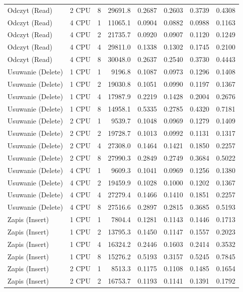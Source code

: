 \begin{table}[ht]
{\begin{tabular}{llcrrrrr}
Odczyt (Read) & 2 CPU & 8 & 29691.8 & 0.2687 & 0.2603 & 0.3739 & 0.4308 \\
Odczyt (Read) & 4 CPU & 1 & 11065.1 & 0.0904 & 0.0882 & 0.0988 & 0.1163 \\
Odczyt (Read) & 4 CPU & 2 & 21735.7 & 0.0920 & 0.0907 & 0.1120 & 0.1249 \\
Odczyt (Read) & 4 CPU & 4 & 29811.0 & 0.1338 & 0.1302 & 0.1745 & 0.2100 \\
Odczyt (Read) & 4 CPU & 8 & 30048.0 & 0.2637 & 0.2540 & 0.3730 & 0.4443 \\
Usuwanie (Delete) & 1 CPU & 1 & 9196.8 & 0.1087 & 0.0973 & 0.1296 & 0.1408 \\
Usuwanie (Delete) & 1 CPU & 2 & 19030.8 & 0.1051 & 0.0990 & 0.1197 & 0.1367 \\
Usuwanie (Delete) & 1 CPU & 4 & 17987.9 & 0.2219 & 0.1428 & 0.2004 & 0.2676 \\
Usuwanie (Delete) & 1 CPU & 8 & 14958.1 & 0.5335 & 0.2785 & 0.4320 & 0.7181 \\
Usuwanie (Delete) & 2 CPU & 1 & 9539.7 & 0.1048 & 0.0969 & 0.1279 & 0.1409 \\
Usuwanie (Delete) & 2 CPU & 2 & 19728.7 & 0.1013 & 0.0992 & 0.1131 & 0.1317 \\
Usuwanie (Delete) & 2 CPU & 4 & 27308.0 & 0.1464 & 0.1421 & 0.1850 & 0.2257 \\
Usuwanie (Delete) & 2 CPU & 8 & 27990.3 & 0.2849 & 0.2749 & 0.3684 & 0.5022 \\
Usuwanie (Delete) & 4 CPU & 1 & 9609.3 & 0.1041 & 0.0969 & 0.1256 & 0.1380 \\
Usuwanie (Delete) & 4 CPU & 2 & 19459.9 & 0.1028 & 0.1000 & 0.1202 & 0.1367 \\
Usuwanie (Delete) & 4 CPU & 4 & 27279.4 & 0.1466 & 0.1410 & 0.1851 & 0.2257 \\
Usuwanie (Delete) & 4 CPU & 8 & 27516.6 & 0.2897 & 0.2815 & 0.3685 & 0.5193 \\
Zapis (Insert) & 1 CPU & 1 & 7804.4 & 0.1281 & 0.1143 & 0.1446 & 0.1713 \\
Zapis (Insert) & 1 CPU & 2 & 13795.3 & 0.1450 & 0.1147 & 0.1557 & 0.2023 \\
Zapis (Insert) & 1 CPU & 4 & 16324.2 & 0.2446 & 0.1603 & 0.2414 & 0.3532 \\
Zapis (Insert) & 1 CPU & 8 & 15276.2 & 0.5193 & 0.3157 & 0.5245 & 0.7845 \\
Zapis (Insert) & 2 CPU & 1 & 8513.3 & 0.1175 & 0.1108 & 0.1485 & 0.1654 \\
Zapis (Insert) & 2 CPU & 2 & 16753.7 & 0.1193 & 0.1141 & 0.1391 & 0.1792 \\

\end{tabular}}
\end{table}

